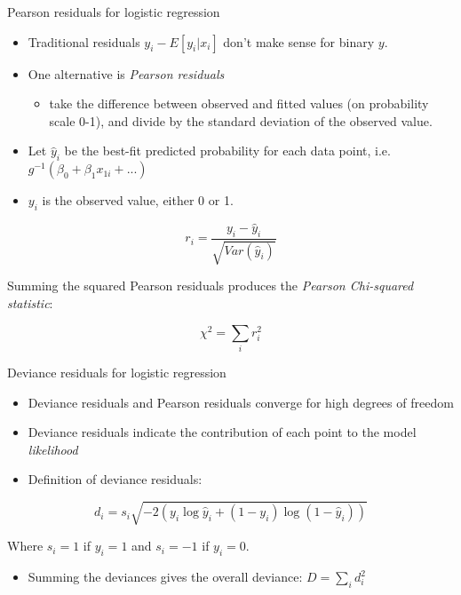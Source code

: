 \documentclass[
  ignorenonframetext,
]{beamer}
\providecommand{\tightlist}{%
  \setlength{\itemsep}{0pt}\setlength{\parskip}{0pt}}
\begin{document}
\begin{frame}{Pearson residuals for logistic regression}
\protect\hypertarget{pearson-residuals-for-logistic-regression}{}

\begin{itemize}
\tightlist
\item
  Traditional residuals \(y_i - E[y_i|x_i]\) don't make sense for binary
  \(y\).
\item
  One alternative is \emph{Pearson residuals}

  \begin{itemize}
  \tightlist
  \item
    take the difference between observed and fitted values (on
    probability scale 0-1), and divide by the standard deviation of the
    observed value.
  \end{itemize}
\item
  Let \(\hat y_i\) be the best-fit predicted probability for each data
  point, i.e.~\(g^{-1}(\beta_0 + \beta_1 x_{1i} + ...)\)
\item
  \(y_i\) is the observed value, either 0 or 1.
\end{itemize}

\[
r_i = \frac{y_i - \hat y_i}{ \sqrt{ Var(\hat y_i) }}
\]

Summing the squared Pearson residuals produces the \emph{Pearson
Chi-squared statistic}:

\[
\chi ^2 = \sum_i r_i^2
\]

\end{frame}

\begin{frame}{Deviance residuals for logistic regression}
\protect\hypertarget{deviance-residuals-for-logistic-regression}{}

\begin{itemize}
\tightlist
\item
  Deviance residuals and Pearson residuals converge for high degrees of
  freedom
\item
  Deviance residuals indicate the contribution of each point to the
  model \emph{likelihood}
\item
  Definition of deviance residuals:
\end{itemize}

\[
d_i = s_i \sqrt{ -2 ( y_i \log \hat y_i + (1-y_i) \log (1 - \hat y_i) ) }
\]

Where \(s_i = 1\) if \(y_i = 1\) and \(s_i = -1\) if \(y_i = 0\).

\begin{itemize}
\tightlist
\item
  Summing the deviances gives the overall deviance: \(D = \sum_i d_i^2\)
\end{itemize}

\end{frame}
\end{document}
